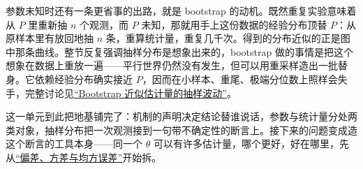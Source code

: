 参数未知时还有一条更省事的出路，就是 bootstrap 的动机。既然重复实验意味着从 \(P\) 里重新抽 \(n\) 个观测，而 \(P\) 未知，那就用手上这份数据的经验分布顶替 \(P\)：从原样本里有放回地抽 \(n\) 条，重算统计量，重复几千次。得到的分布近似的正是图中那条曲线。整节反复强调抽样分布是想象出来的，bootstrap 做的事情是把这个想象在数据上重放一遍——平行世界仍然没有发生，但可以用重采样造出一批替身。它依赖经验分布确实接近 \(P\)，因而在小样本、重尾、极端分位数上照样会失手，完整讨论见\hyperref[sec:11-Mathematical-Statistics/06-Resampling-and-Model-Selection/01]{``Bootstrap 近似估计量的抽样波动''}。

这一单元到此把地基铺完了：机制的声明决定结论替谁说话，参数与统计量分处两类对象，抽样分布把一次观测接到一句带不确定性的断言上。接下来的问题变成造这个断言的工具本身——同一个 \(\theta\) 可以有许多估计量，哪个更好，好在哪里，先从\hyperref[sec:11-Mathematical-Statistics/02-Point-Estimation/01]{``偏差、方差与均方误差''}开始拆。

